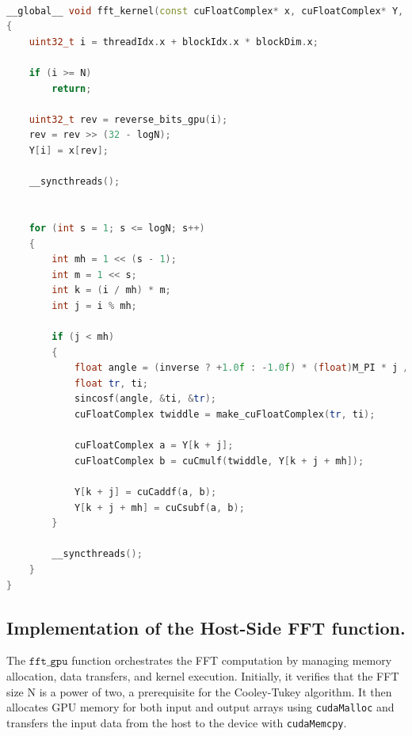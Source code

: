 \documentclass[12pt]{article}
\theoremstyle{definition}
\begin{document}
\begin{lstlisting}[language=C++, caption={Cooley-Tukey FFT algorithm on GPU.}]

__global__ void fft_kernel(const cuFloatComplex* x, cuFloatComplex* Y, uint32_t N, int logN, bool inverse)
{
    uint32_t i = threadIdx.x + blockIdx.x * blockDim.x;

    if (i >= N)
        return;

    uint32_t rev = reverse_bits_gpu(i);
    rev = rev >> (32 - logN);
    Y[i] = x[rev];

    __syncthreads();


    for (int s = 1; s <= logN; s++)
    {
        int mh = 1 << (s - 1); 
        int m = 1 << s;      
        int k = (i / mh) * m; 
        int j = i % mh;       

        if (j < mh)
        {
            float angle = (inverse ? +1.0f : -1.0f) * (float)M_PI * j / mh;
            float tr, ti;
            sincosf(angle, &ti, &tr);
            cuFloatComplex twiddle = make_cuFloatComplex(tr, ti);

            cuFloatComplex a = Y[k + j];
            cuFloatComplex b = cuCmulf(twiddle, Y[k + j + mh]);

            Y[k + j] = cuCaddf(a, b);
            Y[k + j + mh] = cuCsubf(a, b);
        }

        __syncthreads();
    }
}

\end{lstlisting}
\subsection{Implementation of the Host-Side FFT function.}

The $\texttt{fft\_gpu}$ function orchestrates the FFT computation by managing memory allocation, data transfers, and kernel execution. Initially, it verifies that the FFT size N is a power of two, a prerequisite for the Cooley-Tukey algorithm. It then allocates GPU memory for both input and output arrays using \texttt{cudaMalloc} and transfers the input data from the host to the device with \texttt{cudaMemcpy}.
\end{document}
